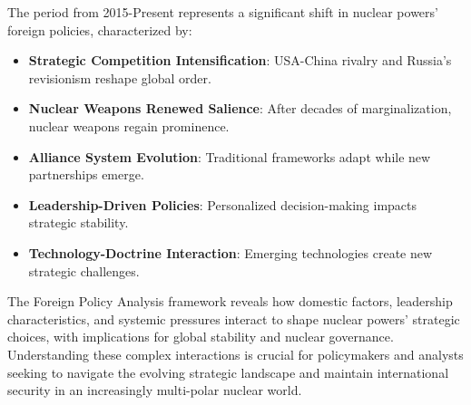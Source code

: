 \documentclass[a4paper, 11pt]{article}
\begin{document}
The period from 2015-Present represents a significant shift in nuclear powers' foreign policies, characterized by:

\begin{itemize}
	\item \textbf{Strategic Competition Intensification}: USA-China rivalry and Russia's revisionism reshape global order.
	\item \textbf{Nuclear Weapons Renewed Salience}: After decades of marginalization, nuclear weapons regain prominence.
	\item \textbf{Alliance System Evolution}: Traditional frameworks adapt while new partnerships emerge.
	\item \textbf{Leadership-Driven Policies}: Personalized decision-making impacts strategic stability.
	\item \textbf{Technology-Doctrine Interaction}: Emerging technologies create new strategic challenges.
\end{itemize}

The Foreign Policy Analysis framework reveals how domestic factors, leadership characteristics, and systemic pressures interact to shape nuclear powers' strategic choices, with implications for global stability and nuclear governance. Understanding these complex interactions is crucial for policymakers and analysts seeking to navigate the evolving strategic landscape and maintain international security in an increasingly multi-polar nuclear world.
\end{document}
